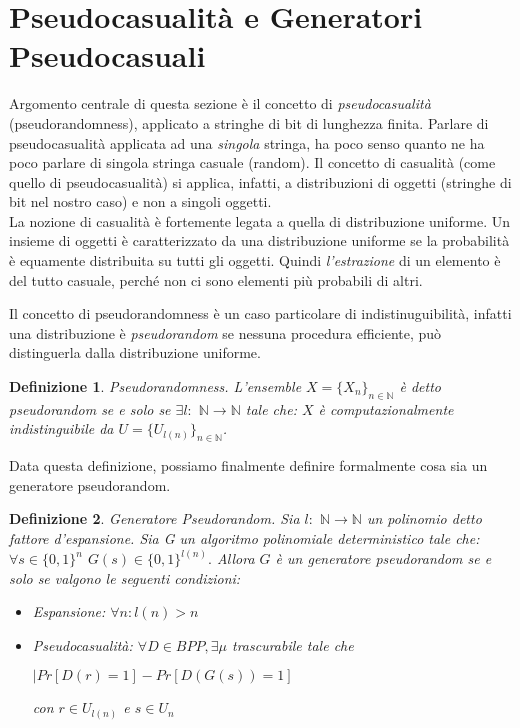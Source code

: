 \documentclass[a4paper,openright,twoside,12pt]{report}
\newtheorem{definizione}{Definizione}[chapter]
\begin{document}
\section{Pseudocasualit\`a e Generatori Pseudocasuali}
Argomento centrale di questa sezione \`e il concetto di \emph{pseudocasualit\`a} (pseudorandomness), applicato a stringhe di bit di lunghezza finita.
Parlare di pseudocasualit\`a applicata ad una \emph{singola} stringa, ha poco senso quanto ne ha poco parlare di singola stringa casuale (random).
Il concetto di casualit\`a (come quello di pseudocasualit\`a) si applica, infatti, a distribuzioni di oggetti (stringhe di bit nel nostro caso) e non a singoli oggetti.\\
La nozione di casualit\`a \`e fortemente legata a quella di distribuzione uniforme. Un insieme di oggetti \`e caratterizzato
da una distribuzione uniforme se la probabilit\`a \`e equamente distribuita su tutti gli oggetti. Quindi \emph{l'estrazione} di un elemento \`e del tutto casuale, 
perch\'e non ci sono elementi pi\`u probabili di altri.

Il concetto di pseudorandomness \`e un caso particolare di indistinuguibilit\`a, infatti una distribuzione \`e \emph{pseudorandom} se nessuna procedura efficiente, 
pu\`o distinguerla dalla distribuzione uniforme.
\begin{definizione}{Pseudorandomness.}
L'ensemble $X=\{X_n\}_{n \in \mathbb{N}}$ \`e detto pseudorandom se e solo se $ \exists l:$ $\mathbb{N}\rightarrow\mathbb{N}$ tale che: 
$X$ \`e computazionalmente indistinguibile da $U=\{U_{l(n)}\}_{n \in \mathbb{N}} $.  
\end{definizione}
Data questa definizione, possiamo finalmente definire formalmente cosa sia un generatore pseudorandom.\newpage
\begin{definizione}{Generatore Pseudorandom.}
Sia $l:$ $\mathbb{N}\rightarrow\mathbb{N}$ un polinomio detto fattore d'espansione. 
Sia G un algoritmo polinomiale deterministico tale che: $\forall s \in \{0, 1\}^{n}$ $G(s) \in \{0, 1\}^{l(n)}.$
Allora $G$ \`e un generatore pseudorandom se e solo se valgono le seguenti condizioni:
\begin{itemize}
 \item Espansione: $\forall n: l(n) > n$
 \item Pseudocasualit\`a: $\forall D \in BPP, \exists \mu$ trascurabile tale che \begin{center}
                                                   $\lvert Pr[D(r) = 1] - Pr[D(G(s)) = 1]$                               
                                                                                 \end{center} con $r \in U_{l(n)}$ e $s \in U_{n}$
\end{itemize}
\end{definizione}
\end{document}
